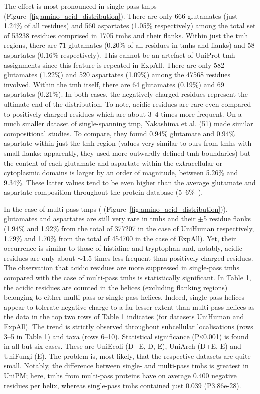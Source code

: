 The effect is most pronounced in single-pass \gls{tmp}s (Figure~\ref{fig:amino_acid_distribution}). There are only 666 glutamates (just 1.24\% of all residues) and 560 aspartates (1.05\% respectively) among the total set of 53238 residues comprised in 1705 \gls{tmh}s and their flanks. Within just the \gls{tmh} regions, there are 71 glutamates (0.20\% of all residues in \gls{tmh}s and flanks) and 58 aspartates (0.16\% respectively). This cannot be an artefact of UniProt \gls{tmh} assignments since this feature is repeated in ExpAll. There are only 582 glutamates (1.22\%) and 520 aspartates (1.09\%) among the 47568 residues involved. Within the \gls{tmh} itself, there are 64 glutamates (0.19\%) and 69 aspartates (0.21\%). In both cases, the negatively charged residues represent the ultimate end of the distribution. To note, acidic residues are rare even compared to positively charged residues which are about 3--4 times more frequent. On a much smaller dataset of single-spanning \gls{tmp}, Nakashima et al. (51) made similar compositional studies. To compare, they found 0.94\% glutamate and 0.94\% aspartate within just the \gls{tmh} region (values very similar to ours from \gls{tmh}s with small flanks; apparently, they used more outwardly defined \gls{tmh} boundaries) but the content of each glutamate and aspartate within the extracellular or cytoplasmic domains is larger by an order of magnitude, between 5.26\% and 9.34\%. These latter values tend to be even higher than the average glutamate and aspartate composition throughout the protein database (5--6\%~\cite{Nakashima1992}).

In the case of multi-pass \gls{tmp}s ( (Figure~\ref{fig:amino_acid_distribution})), glutamates and aspartates are still very rare in \gls{tmh}s and their $\pm$5 residue flanks (1.94\% and 1.92\% from the total of 377207 in the case of UniHuman respectively, 1.79\% and 1.70\% from the total of 454700 in the case of ExpAll). Yet, their occurrence is similar to those of histidine and tryptophan and, notably, acidic residues are only about $\sim$1.5 times less frequent than positively charged residues. The observation that acidic residues are more suppressed in single-pass \gls{tmh}s compared with the case of multi-pass \gls{tmh}s is statistically significant. In Table 1, the acidic residues are counted in the helices (excluding flanking regions) belonging to either multi-pass or single-pass helices. Indeed, single-pass helices appear to tolerate negative charge to a far lesser extent than multi-pass helices as the data in the top two rows of Table 1 indicates (for datasets UniHuman and ExpAll). The trend is strictly observed throughout subcellular localisations (rows 3--5 in Table 1) and taxa (rows 6--10). Statistical significance (P≤0.001) is found in all but six cases. These are UniEcoli (D+E, D, E), UniArch (D+E, E) and UniFungi (E). The problem is, most likely, that the respective datasets are quite small. Notably, the difference between single- and multi-pass \gls{tmh}s is greatest in UniPM\@; here, \gls{tmh}s from multi-pass proteins have on average 0.400 negative residues per helix, whereas single-pass \gls{tmh}s contained just 0.039 (P\=3.86e-28).

